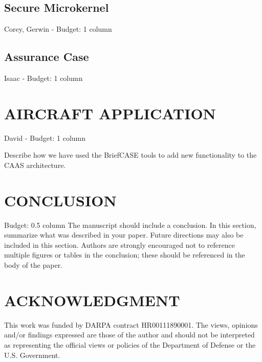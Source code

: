 \documentclass{IEEEcsmag}
\begin{document}
\subsection{Secure Microkernel}
Corey, Gerwin -  Budget: 1 column
\cite{sel4-formal}

\subsection{Assurance Case}
Isaac -  Budget: 1 column
\cite{resolute-destion}

\section{AIRCRAFT APPLICATION}
David -  Budget: 1 column

Describe how we have used the BriefCASE tools to add new functionality to the CAAS architecture.  

\section{CONCLUSION}
 Budget: 0.5 column
The manuscript should include a conclusion. In this section, summarize what was described in your paper. Future directions may also be included in this section. Authors are strongly encouraged not to reference multiple figures or tables in the conclusion; these should be referenced in the body of the paper.

\section{ACKNOWLEDGMENT}

This work was funded by DARPA contract HR00111890001. The
views, opinions and/or findings expressed are those of the author
and should not be interpreted as representing the official views or
policies of the Department of Defense or the U.S. Government.





\end{document}
